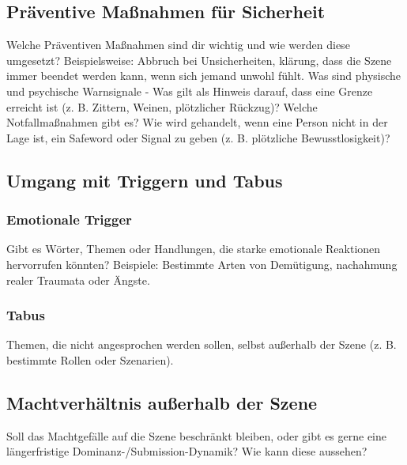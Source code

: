 \documentclass[a4paper,12pt]{article}
\begin{document}
\newpage
\subsection{Präventive Maßnahmen für Sicherheit}
\noindent Welche Präventiven Maßnahmen sind dir wichtig und wie werden diese umgesetzt? Beispielsweise: Abbruch bei Unsicherheiten, klärung, dass die Szene immer beendet werden kann, wenn sich jemand unwohl fühlt. Was sind physische und psychische Warnsignale - Was gilt als Hinweis darauf, dass eine Grenze erreicht ist (z. B. Zittern, Weinen, plötzlicher Rückzug)? Welche Notfallmaßnahmen gibt es? Wie wird gehandelt, wenn eine Person nicht in der Lage ist, ein Safeword oder Signal zu geben (z. B. plötzliche Bewusstlosigkeit)? \newline
\noindent \TextField[name=KommPreventSecure,multiline=true,height=40em, width=37em]{}

\newpage
\subsection{Umgang mit Triggern und Tabus}
\subsubsection{Emotionale Trigger}
\noindent
Gibt es Wörter, Themen oder Handlungen, die starke emotionale Reaktionen hervorrufen könnten? Beispiele: Bestimmte Arten von Demütigung, nachahmung realer Traumata oder Ängste.\newline
\noindent \TextField[name=TriggerEmotional,multiline=true,height=15em, width=37em]{}

\subsubsection{Tabus}
Themen, die nicht angesprochen werden sollen, selbst außerhalb der Szene (z. B. bestimmte Rollen oder Szenarien).\newline
\noindent \TextField[name=TriggerTabus,multiline=true,height=15em, width=37em]{}

\subsection{Machtverhältnis außerhalb der Szene}
Soll das Machtgefälle auf die Szene beschränkt bleiben, oder gibt es gerne eine längerfristige Dominanz-/Submission-Dynamik? Wie kann diese aussehen?\newline
\noindent \TextField[name=OutOfScene,multiline=true,height=8em, width=37em]{}
\end{document}
